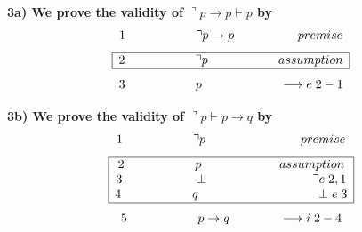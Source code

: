 \documentclass[a4paper]{article}
\begin{document}
\textbf{{\large\hspace{1 cm} 3a) We prove the validity of $\urcorner p \rightarrow p \vdash p$ by}}
{\large $$1 \hspace{2 cm} \urcorner p \rightarrow p \hspace{1.8 cm} premise$$ 
$$\begin{array}{|c|}
\hline 
\textcolor{black}{2 \hspace{2 cm} \urcorner p \hspace{2 cm} assumption}\\
\hline
\end{array}$$ $$3 \hspace{2 cm}  p \hspace{2.2 cm} \longrightarrow e\hspace{0.1 cm} 2-1$$}

\textbf{{\large\hspace{1 cm} 3b) We prove the validity of $\urcorner p \vdash p \rightarrow q$ by}}
{\large $$1 \hspace{2 cm} \urcorner p \hspace{2.7 cm} premise$$ 
$$\begin{array}{|c|}
\hline 
\textcolor{black}{2 \hspace{2 cm} p \hspace{2.2 cm} assumption}\\

\textcolor{black}{3 \hspace{2 cm} \perp \hspace{3 cm} \urcorner e \hspace{0.1 cm} 2,1}\\

\textcolor{black}{4 \hspace{2 cm} q \hspace{3.3 cm} \perp e \hspace{0.1 cm} 3}\\
\hline
\end{array}$$ 
$$5 \hspace{2 cm} p \rightarrow q \hspace{1.4 cm} \longrightarrow i \hspace{0.1 cm} 2-4$$}\\

\newpage
\end{document}
